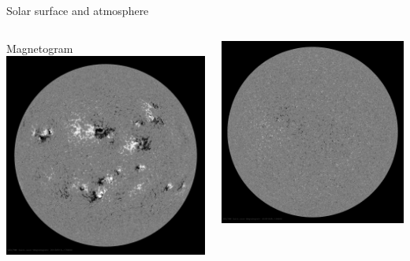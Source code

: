 \begin{frame}[plain,c]{Solar surface and atmosphere}{}
\begin{columns}[c]
		
		\centering \small Magnetogram
		\includegraphics[width=\textwidth]{../talk_figures/20130516_170000_1024_HMIB.jpg}
		
		\includegraphics[width=\textwidth]{../talk_figures/20181028_120000_1024_HMIB.jpg}
		

\end{columns}
\end{frame}
